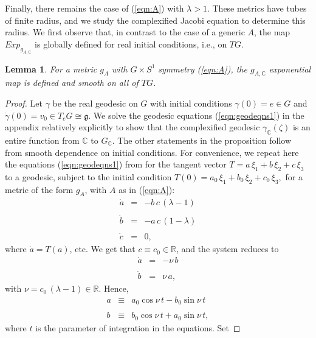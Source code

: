 \documentclass[12pt,reqno]{amsart}\usepackage{amssymb,amsmath,amscd,epsfig,amsthm,enumerate,import,eufrak}
\newtheorem{lemma}[theorem]{Lemma}
\theoremstyle{definition}
\theoremstyle{remark}
\numberwithin{equation}{section}
\theoremstyle{plain}
\theoremstyle{definition}
\def \r {\mathbb{R}}
\def \c {\mathbb{C}}
\def \mfg {\mathfrak{g}}
\def \vs {\vskip 2mm}
\theoremstyle{remark}
\numberwithin{theorem}{section}
\begin{document}
%
\vs
%
Finally, there remains the case of (\ref{eqn:A}) with $\lambda > 1$. These metrics have tubes of finite radius, and we study the complexified Jacobi equation to determine this radius. We first observe that, in contrast to the case of a generic $A$, the map $Exp_{g_{A,\c}}$ is globally defined for real initial conditions, i.e., on $TG$.
%
\begin{lemma}\label{lem:Expdefd}
	For a metric $g_A$ with $G\times S^1$ symmetry (\ref{eqn:A}), the $g_{A,\c}$ exponential map is defined and smooth on all of $TG$.	
\end{lemma}
%
\begin{proof} 
	Let $\gamma$ be the real geodesic on $G$ with initial conditions $\gamma(0) = e \in G$ and $\dot{\gamma}(0) = v_0 \in T_eG \cong \mfg$. We solve the geodesic equations (\ref{eqn:geodeqns1}) in the appendix \cite{web} relatively explicitly to show that the complexified geodesic $\gamma_{\c}(\zeta)$ is an entire function from $\c$ to $G_{\c}$. The other statements in the proposition follow from smooth dependence on initial conditions.
\vs
For convenience, we repeat here the equations (\ref{eqn:geodeqns1}) from \cite{web} for the tangent vector $T = a\, \xi_1+b\, \xi_2+c\, \xi_3$ to a geodesic, subject to the initial condition $T(0) = a_0 \, \xi_1+ b_0\, \xi_2 +c_0 \, \xi_3,$ for a metric of the form $g_A$,  with $A$ as in (\ref{eqn:A}):
\[
	\begin{array}{rcl}
		\dot{a} & = & -b\, c\, (\lambda - 1) \\
		&&\\
		\dot{b} & = & - a\, c\, (1 - \lambda) \\
		&&\\
		\dot{c} & = & 0,
	\end{array}
\]
%
%
where $\dot{a} = T(a)$, etc. We get that $c \equiv c_0 \in \r$, and the system reduces to 
%
%
\[
	\begin{array}{rcr}
		\dot{a} & = & -\nu\, b \\
		&&\\
		\dot{b} & = & \nu \, a, 
	\end{array}
\]
%
%
with $\nu = c_0 \, (\lambda - 1) \in \r$. Hence, 
%
\vs
%
\[
	\begin{array}{rcl} a & \equiv & a_0 \cos \nu \, t - b_0 \sin \nu \,t \\&&\\ b & \equiv & b_0 \cos \nu \,t + a_0 \sin \nu \, t, \end{array}
\]
%
\vs
where $t$ is the parameter of integration in the equations. Set 

\end{proof}
\end{document}
